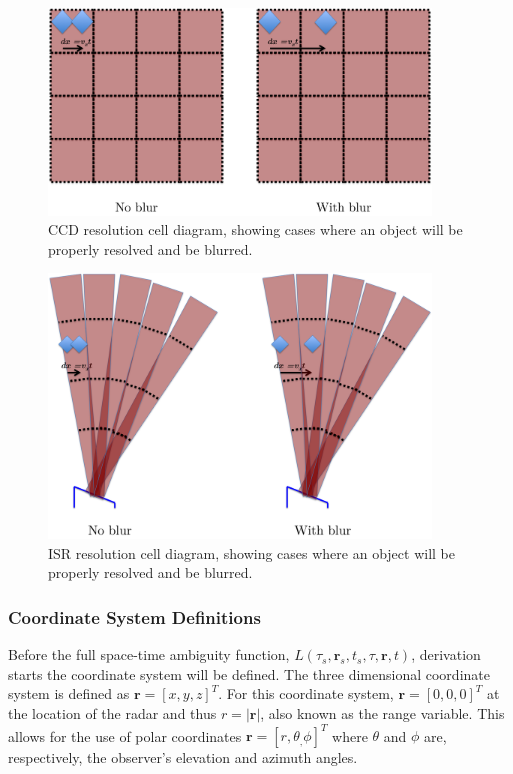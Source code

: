 \begin{figure}[h!]
\centering
	\includegraphics[width=4in]{ccddiagramall}
	\caption{CCD resolution cell diagram, showing cases where an object will be properly resolved and be blurred.}
	\label{fig:ccd}
\end{figure}

\begin{figure}[h!]
\centering
	\includegraphics[width=4in]{radardiagramall}
	\caption{ISR resolution cell diagram, showing cases where an object will be properly resolved and be blurred.}
	\label{fig:radarblur}
\end{figure}

\subsubsection{Coordinate System Definitions}

Before the full space-time ambiguity function, $L(\tau_s,\mathbf{r}_s,t_s,\tau,\mathbf{r},t)$, derivation starts the coordinate system will be defined.  The three dimensional coordinate system is defined as $\mathbf{r}=[x,y,z]^T$. For this coordinate system, $\mathbf{r}=[0,0,0]^T$ at the location of the radar and thus $r=|\mathbf{r}|$, also known as the range variable. This allows for the use of polar coordinates $\mathbf{r} =  [r,\theta_,\phi]^T$ where $\theta$ and $\phi$ are, respectively, the observer's elevation and azimuth angles.

